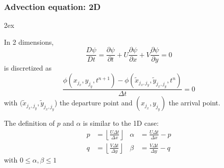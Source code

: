 \documentclass[aspectratio=149,9pt]{beamer}
\begin{document}
%
%
\begin{frame}
	\frametitle{Advection equation: 2D}
	\begin{myitemize}{2ex}
		\item In 2 dimensions,
			\begin{equation*}
				\frac{D\psi}{D t}=\frac{\partial \psi}{\partial t}+U\frac{\partial \psi}{\partial x}+V\frac{\partial \psi}{\partial y} = 0
			\end{equation*}
			is discretized as
			\begin{equation*}
				\frac{\phi (x_{j_x}, y_{j_y}, t^{n+1}) - \phi (\tilde x_{j_x,j_y}, \tilde y_{j_x,j_y}, t^n ) } {\Delta t} = 0
			\end{equation*}
			with $(\tilde x_{j_x,j_y}, \tilde y_{j_x,j_y}$) the departure point and $(x_{j_x}, y_{j_y})$ the arrival point.
		\item The definition of $p$ and $\alpha$ is similar to the 1D case:
			\begin{align*}
				p &= \left\lfloor \frac{U \Delta t}{\Delta x} \right\rfloor & \alpha &	= \frac{U \Delta t }{\Delta x}-p \\
				q &= \left\lfloor \frac{V \Delta t}{\Delta y} \right\rfloor	&	\beta &	= \frac{V \Delta t }{\Delta y}-q
			\end{align*}
			with $0\le\alpha,\beta\le1$
	\end{myitemize}
\end{frame}
%
%
\end{document}

